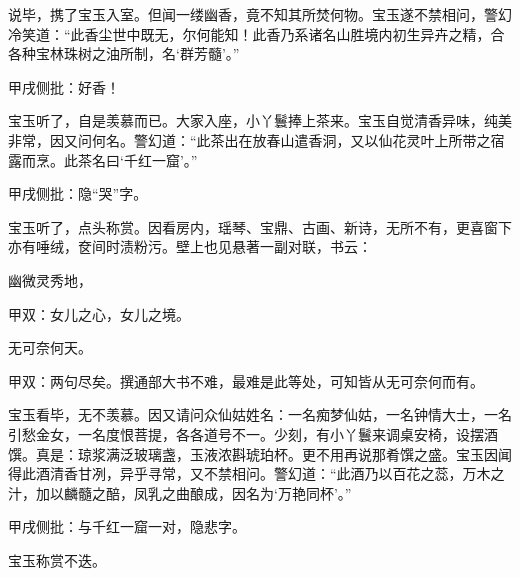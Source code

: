 \begin{parag}


    说毕，携了宝玉入室。但闻一缕幽香，竟不知其所焚何物。宝玉遂不禁相问，警幻冷笑道：“此香尘世中既无，尔何能知！此香乃系诸名山胜境内初生异卉之精，合各种宝林珠树之油所制，名‘群芳髓’。”\begin{note}甲戌侧批：好香！\end{note}宝玉听了，自是羡慕而已。大家入座，小丫鬟捧上茶来。宝玉自觉清香异味，纯美非常，因又问何名。警幻道：“此茶出在放春山遣香洞，又以仙花灵叶上所带之宿露而烹。此茶名曰‘千红一窟’。”\begin{note}甲戌侧批：隐“哭”字。\end{note}宝玉听了，点头称赏。因看房内，瑶琴、宝鼎、古画、新诗，无所不有，更喜窗下亦有唾绒，奁间时渍粉污。壁上也见悬著一副对联，书云：
\end{parag}

\begin{poem}
    \begin{pl}
        幽微灵秀地，\end{pl}\begin{note}甲双：女儿之心，女儿之境。\end{note}

    \begin{pl}无可奈何天。\end{pl}\begin{note}甲双：两句尽矣。撰通部大书不难，最难是此等处，可知皆从无可奈何而有。\end{note}
\end{poem}

\begin{parag}

    宝玉看毕，无不羡慕。因又请问众仙姑姓名：一名痴梦仙姑，一名钟情大士，一名引愁金女，一名度恨菩提，各各道号不一。少刻，有小丫鬟来调桌安椅，设摆酒馔。真是：琼浆满泛玻璃盏，玉液浓斟琥珀杯。更不用再说那肴馔之盛。宝玉因闻得此酒清香甘冽，异乎寻常，又不禁相问。警幻道：“此酒乃以百花之蕊，万木之汁，加以麟髓之醅，凤乳之曲酿成，因名为‘万艳同杯’。”\begin{note}甲戌侧批：与千红一窟一对，隐悲字。\end{note}宝玉称赏不迭。
\end{parag}


